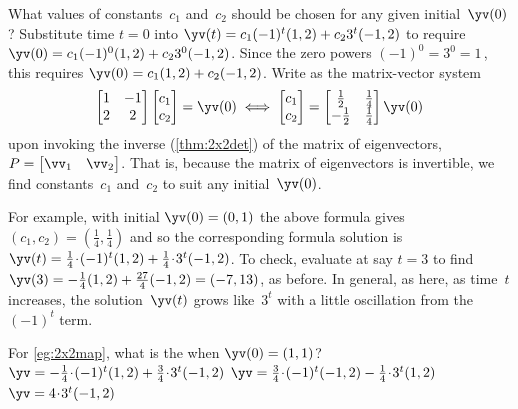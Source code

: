 \begin{example}
\begin{solution}
What values of constants~\(c_1\) and~\(c_2\) should be chosen for any given initial~\(\yv(0)\)?
Substitute time \(t=0\) into \(\yv(t)=c_1(-1)^t(1,2)+c_23^t(-1,2)\) to require \(\yv(0)=c_1(-1)^0(1,2)+c_23^0(-1,2)\).
Since the zero powers \((-1)^0=3^0=1\)\,, this requires \(\yv(0)=c_1(1,2)+c_2(-1,2)\).
Write as the matrix-vector system
\begin{equation*}
\begin{bmatrix} 1&-1\\2&2 \end{bmatrix}
\begin{bmatrix} c_1\\c_2 \end{bmatrix}
=\yv(0)
\iff
\begin{bmatrix} c_1\\c_2 \end{bmatrix}
=\begin{bmatrix} \frac12&\frac14\\-\frac12&\frac14 \end{bmatrix}\yv(0)
\end{equation*}
upon invoking the inverse (\autoref{thm:2x2det}) of the matrix of eigenvectors, \(P=\begin{bmatrix} \vv_1&\vv_2 \end{bmatrix}\).
That is, because the matrix of eigenvectors is invertible, we find constants~\(c_1\) and~\(c_2\) to suit any initial~\(\yv(0)\).

For example, with initial \(\yv(0)=(0,1)\) the above formula gives \((c_1,c_2)=(\frac14,\frac14)\) and so the corresponding formula solution is \(\yv(t)=\frac14\cdot(-1)^t(1,2)+\frac14\cdot3^t(-1,2)\).
To check, evaluate at say \(t=3\) to find 
\(\yv(3)=-\frac14(1,2)+\frac{27}4(-1,2)=(-7,13)\),
as before.
In general, as here, as time~\(t\) increases, the solution~\(\yv(t)\) grows like~\(3^t\) with a little oscillation from the~\((-1)^t\) term.
\end{solution}
\end{example}




\begin{activity}
For \autoref{eg:2x2map}, what is the  when \(\yv(0)=(1,1)\)?
{\(\yv=-\frac14\cdot(-1)^t(1,2)+\frac34\cdot3^t(-1,2)\)}
{\(\yv=\frac34\cdot(-1)^t(-1,2)-\frac14\cdot3^t(1,2)\)}
{\(\yv=4\cdot3^t(-1,2)\)}
\end{activity}




